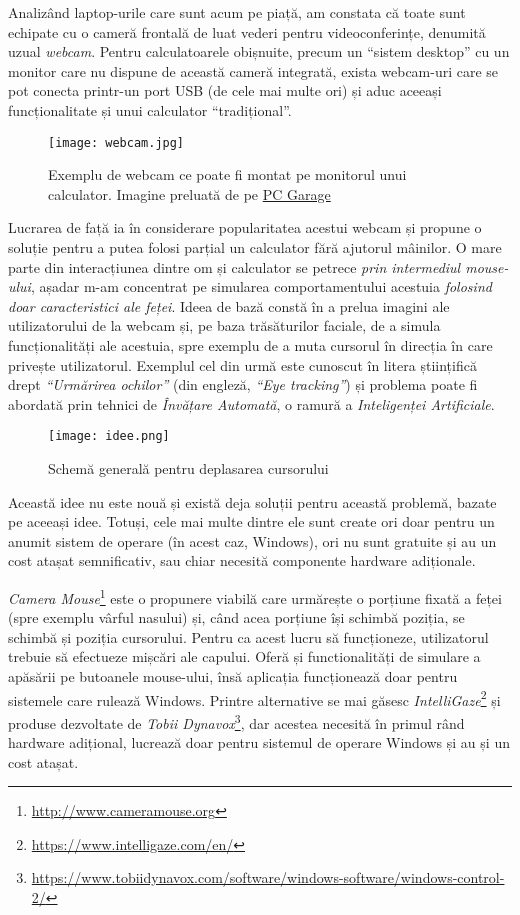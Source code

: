 Analizând laptop-urile care sunt acum pe piață, am constata că toate sunt echipate cu o cameră frontală de luat vederi pentru videoconferințe, denumită uzual \emph{webcam}.
Pentru calculatoarele obișnuite, precum un ``sistem desktop'' cu un monitor care nu dispune de această cameră integrată, exista webcam-uri care se pot conecta printr-un port USB (de cele mai multe ori) și aduc aceeași funcționalitate și unui calculator ``tradițional''.

\begin{figure}[h]
    \centering
    \texttt{[image: webcam.jpg]}
    \caption{Exemplu de webcam ce poate fi montat pe monitorul unui calculator. Imagine preluată de pe \href{https://www.pcgarage.ro/camere-web/logitech/streamcam-off-white/}{PC Garage}}
\end{figure}

Lucrarea de față ia în considerare popularitatea acestui webcam și propune o soluție pentru a putea folosi parțial un calculator fără ajutorul mâinilor.
O mare parte din interacțiunea dintre om și calculator se petrece \emph{prin intermediul mouse-ului}, așadar m-am concentrat pe simularea comportamentului acestuia \emph{folosind doar caracteristici ale feței}.
Ideea de bază constă în a prelua imagini ale utilizatorului de la webcam și, pe baza trăsăturilor faciale, de a simula funcționalități ale acestuia, spre exemplu de a muta cursorul în direcția în care privește utilizatorul.
Exemplul cel din urmă este cunoscut în litera științifică drept \emph{``Urmărirea ochilor''} (din engleză, \emph{``Eye tracking''}) și problema poate fi abordată prin tehnici de \emph{Învățare Automată}, o ramură a \emph{Inteligenței Artificiale}.

\begin{figure}[h]
    \centering
    \texttt{[image: idee.png]}
    \caption{Schemă generală pentru deplasarea cursorului}
\end{figure}

Această idee nu este nouă și există deja soluții pentru această problemă, bazate pe aceeași idee.
Totuși, cele mai multe dintre ele sunt create ori doar pentru un anumit sistem de operare (în acest caz, Windows), ori nu sunt gratuite și au un cost atașat semnificativ, sau chiar necesită componente hardware adiționale.

\emph{Camera Mouse}\footnote{\url{http://www.cameramouse.org}} este o propunere viabilă care urmărește o porțiune fixată a feței (spre exemplu vârful nasului) și, când acea porțiune își schimbă poziția, se schimbă și poziția cursorului.
Pentru ca acest lucru să funcționeze, utilizatorul trebuie să efectueze mișcări ale capului.
Oferă și functionalități de simulare a apăsării pe butoanele mouse-ului, însă aplicația funcționează doar pentru sistemele care rulează Windows.
Printre alternative se mai găsesc \emph{IntelliGaze}\footnote{\url{https://www.intelligaze.com/en/}} și produse dezvoltate de \emph{Tobii Dynavox}\footnote{\url{https://www.tobiidynavox.com/software/windows-software/windows-control-2/}}, dar acestea necesită în primul rând hardware adițional, lucrează doar pentru sistemul de operare Windows și au și un cost atașat.

